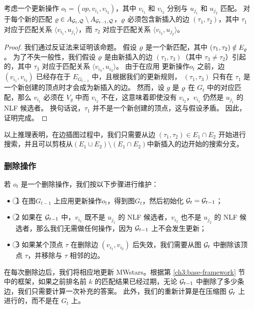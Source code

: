 \begin{theorem} \label{theorem:only-one-edge-to-search}
    考虑一个更新操作 $o_t = (op, v_{i_1}, v_{i_2})$，其中 $v_{i_1}$ 和 $v_{i_2}$ 分别与 $u_{j_1}$ 和 $u_{j_2}$ 匹配。
    对于每个新的匹配 $\varrho \in A_{\mathcal{G}_t, \mathcal{Q}} \setminus A_{\mathcal{G}_{t-1}, \mathcal{Q}}$，$\varrho$ 必须包含新插入的边 $(\tau_1, \tau_2)$，其中 $\tau_1$ 对应于匹配关系 $\langle v_{i_1}, u_{j_1} \rangle$，而 $\tau_2$ 对应于匹配关系 $\langle v_{i_2}, u_{j_2} \rangle$。
\end{theorem}

\begin{proof}
    我们通过反证法来证明该命题。
    假设 $\varrho$ 是一个新匹配，其中 $(\tau_1, \tau_2) \notin E_{\varrho}$。
    为了不失一般性，我们假设 $\varrho$ 是由新插入的边 $(\tau_1, \tau_3)$（其中 $\tau_3 \neq \tau_2$）引起的，其中 $\tau_3$ 对应于匹配关系 $\langle v_{i_3}, u_{i_3} \rangle$。
    由于在应用 更新操作$o_t$ 之前，边 $(v_{i_1}, v_{i_3})$ 已经存在于 $E_{G_{t-1}}$ 中，且根据我们的更新规则，
    $(\tau_1, \tau_3)$ 只有在 $\tau_1$ 是一个新创建的顶点时才会成为新插入的边。
    然而，设 $g$ 是 $\varrho$ 在 $G_t$ 中的对应匹配，那么 $v_{i_1}$ 必须在 $V_g$ 中而 $v_{i_2}$ 不在，这意味着即使没有 $v_{i_2}$，$v_{i_1}$ 仍然是 $u_{j_1}$ 的 NLF 候选者。
    换句话说，$\tau_1$ 并不是一个新创建的顶点，这与假设矛盾。
    因此，证明完成。
\end{proof}

以上推理表明，在边插图过程中，我们只需要从边 $(\tau_1, \tau_2) \in E_1 \cap E_2$ 开始进行搜索，并且可以剪枝从$(E_1 \cup E_2) \setminus (E_1 \cap E_2)$中新插入的边开始的搜索分支。

\subsubsection{删除操作}
若 $o_t$ 是一个删除操作，我们按以下步骤进行维护：
\begin{itemize}
\item \textcircled{1} 在图$G_{t-1}$ 上应用更新操作$o_t$，得到图$G_t$，然后初始化 $\mathcal{G}_t = \mathcal{G}_{t-1}$；
\item \textcircled{2} 如果在 $\mathcal{G}_{t-1}$ 中，$v_{i_1}$ 既不是 $u_{j_1}$ 的 NLF 候选者，$v_{i_2}$ 也不是 $u_{j_2}$ 的 NLF 候选者，那么我们无需做任何操作，因为 $\mathcal{G}_{t-1}$ 上不会发生更新；
\item \textcircled{3} 如果某个顶点 $\tau$ 在删除边 $(v_{i_1}, v_{i_2})$ 后失效，我们需要从图 $\mathcal{G}_t$ 中删除该顶点 $\tau$，并移除与 $\tau$ 相邻的边。
\end{itemize}

在每次删除边后，我们将相应地更新 MWstars。根据第 \ref{ch3:base-framework} 节中的框架，如果之前排名前 $k$ 的匹配结果已经过期，无论 $\mathcal{G}_{t-1}$ 中删除了多少条边，我们只需要计算一次补充的答案。
此外，我们的重新计算是在压缩图 $\mathcal{G}_t$ 上进行的，而不是在 $G_t$ 上。
